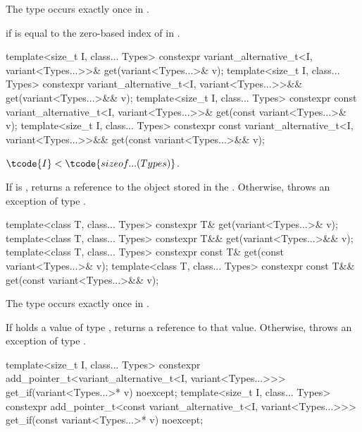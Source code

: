 \begin{itemdescr}
\pnum
\mandates
The type  occurs exactly once in .

\pnum
\returns
{} if  is equal to the zero-based index of  in .
\end{itemdescr}

%
\begin{itemdecl}
template<size_t I, class... Types>
  constexpr variant_alternative_t<I, variant<Types...>>& get(variant<Types...>& v);
template<size_t I, class... Types>
  constexpr variant_alternative_t<I, variant<Types...>>&& get(variant<Types...>&& v);
template<size_t I, class... Types>
  constexpr const variant_alternative_t<I, variant<Types...>>& get(const variant<Types...>& v);
template<size_t I, class... Types>
  constexpr const variant_alternative_t<I, variant<Types...>>&& get(const variant<Types...>&& v);
\end{itemdecl}

\begin{itemdescr}
\pnum
\mandates
$\tcode{I} < \tcode{sizeof...(Types)}$.

\pnum
\effects
If  is , returns a reference to the object stored in
the . Otherwise, throws an exception of type .
\end{itemdescr}

%
\begin{itemdecl}
template<class T, class... Types> constexpr T& get(variant<Types...>& v);
template<class T, class... Types> constexpr T&& get(variant<Types...>&& v);
template<class T, class... Types> constexpr const T& get(const variant<Types...>& v);
template<class T, class... Types> constexpr const T&& get(const variant<Types...>&& v);
\end{itemdecl}

\begin{itemdescr}
\pnum
\mandates
The type  occurs exactly once in .

\pnum
\effects
If  holds a value of type , returns a reference to that value.
Otherwise, throws an exception of type .
\end{itemdescr}

%
%
\begin{itemdecl}
template<size_t I, class... Types>
  constexpr add_pointer_t<variant_alternative_t<I, variant<Types...>>>
    get_if(variant<Types...>* v) noexcept;
template<size_t I, class... Types>
  constexpr add_pointer_t<const variant_alternative_t<I, variant<Types...>>>
    get_if(const variant<Types...>* v) noexcept;
\end{itemdecl}

